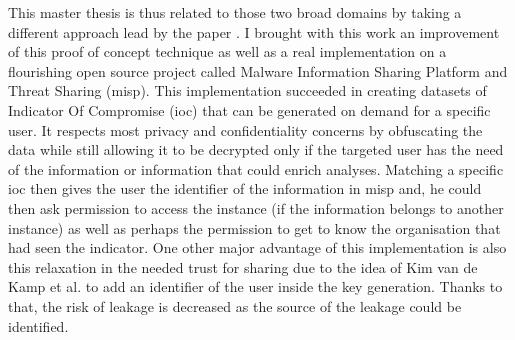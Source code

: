 \documentclass{eplmastersthesis}
\begin{document}
This master thesis is thus related to those two broad domains by taking a different approach lead by the paper \cite{van2016private}. I brought with this work an improvement of this proof of concept technique as well as a real implementation on a flourishing open source project called Malware Information Sharing Platform and Threat Sharing (\gls{misp}).
This implementation succeeded in creating datasets of Indicator Of Compromise (\gls{ioc}) that can be generated on demand for a specific user. It respects most privacy and confidentiality concerns by obfuscating the data while still allowing it to be decrypted only if the targeted user has the need of the information or information that could enrich analyses.
Matching a specific \gls{ioc} then gives the user the identifier of the information in \gls{misp} and, he could then ask permission to access the instance (if the information belongs to another instance) as well as perhaps the permission to get to know the organisation that had seen the indicator.
One other major advantage of this implementation is also this relaxation in the needed trust for sharing due to the idea of Kim van de Kamp et al. to add an identifier of the user inside the key generation. Thanks to that, the risk of leakage is decreased as the source of the leakage could be identified.\\


\printglossary



\newpage

\backcoverpage
\end{document}

